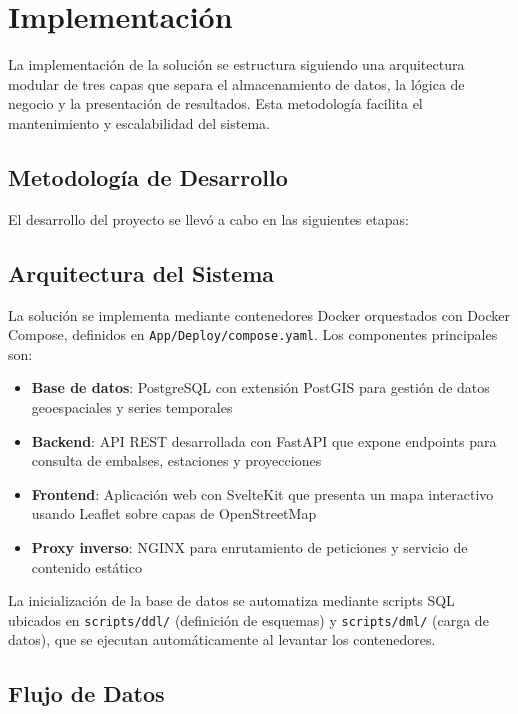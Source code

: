 \section{Implementación}
\label{sec:chp2-3}

La implementación de la solución se estructura siguiendo una arquitectura modular de tres capas que separa el almacenamiento de datos, la lógica de negocio y la presentación de resultados. Esta metodología facilita el mantenimiento y escalabilidad del sistema.

\subsection{Metodología de Desarrollo}

El desarrollo del proyecto se llevó a cabo en las siguientes etapas:


\subsection{Arquitectura del Sistema}

La solución se implementa mediante contenedores Docker orquestados con Docker Compose, definidos en \texttt{App/Deploy/compose.yaml}. Los componentes principales son:

\begin{itemize}
    \item \textbf{Base de datos}: PostgreSQL con extensión PostGIS para gestión de datos geoespaciales y series temporales
    \item \textbf{Backend}: API REST desarrollada con FastAPI que expone endpoints para consulta de embalses, estaciones y proyecciones
    \item \textbf{Frontend}: Aplicación web con SvelteKit que presenta un mapa interactivo usando Leaflet sobre capas de OpenStreetMap
    \item \textbf{Proxy inverso}: NGINX para enrutamiento de peticiones y servicio de contenido estático
\end{itemize}

La inicialización de la base de datos se automatiza mediante scripts SQL ubicados en \texttt{scripts/ddl/} (definición de esquemas) y \texttt{scripts/dml/} (carga de datos), que se ejecutan automáticamente al levantar los contenedores.

\subsection{Flujo de Datos}

